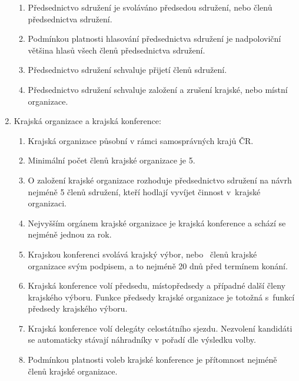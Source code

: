 \documentclass[a4paper]{article}
\begin{document}
\begin{enumerate}
\begin{enumerate}
        \item Předsednictvo sdružení je svoláváno předsedou sdružení, nebo
             členů předsednictva sdružení.

        \item Podmínkou platnosti hlasování předsednictva sdružení je
            nadpoloviční většina hlasů všech členů předsednictva sdružení.

        \item Předsednictvo sdružení schvaluje přijetí členů sdružení.

        \item Předsednictvo sdružení schvaluje založení a zrušení krajské,
            nebo místní organizace.
        \end{enumerate}

    \item Krajská organizace a krajská konference:
        \begin{enumerate}
        \item Krajská organizace působní v rámci samosprávných krajů ČR.

        \item Minimální počet členů krajské organizace je 5.

        \item O založení krajské organizace rozhoduje předsednictvo sdružení na
            návrh nejméně 5 členů sdružení, kteří hodlají vyvíjet činnost
            v~krajské organizaci.

        \item Nejvyšším orgánem krajské organizace je krajská konference a schází
            se nejméně jednou za rok.

        \item Krajskou konferenci svolává krajský výbor, nebo
            ~členů krajské organizace svým podpisem, a to
            nejméně 20 dnů před termínem konání.

        \item Krajská konference volí předsedu, místopředsedy a případné další členy krajského výboru.
            Funkce předsedy krajské organizace je totožná s~funkcí předsedy
            krajského výboru.

        \item Krajská konference volí delegáty celostátního sjezdu. Nezvolení
            kandidáti se automaticky stávají náhradníky v pořadí dle výsledku
            volby.

        \item Podmínkou platnosti voleb krajské konference je přítomnost
            nejméně  členů krajské organizace.
        \end{enumerate}


\end{enumerate}
\end{document}
